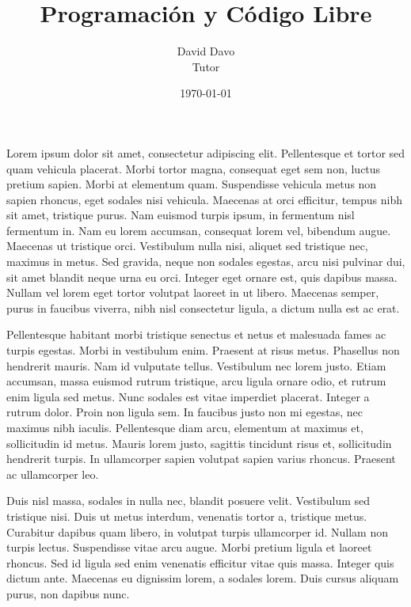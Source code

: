 \documentclass{article}
\title{Programación y Código Libre}
\author{David Davo\\Tutor}
\date{\today{}}
\begin{document}
{\Large\maketitle}
\newpage{}
\tableofcontents
\newpage{}


Lorem ipsum dolor sit amet, consectetur adipiscing elit. Pellentesque et tortor sed quam vehicula placerat. Morbi tortor magna, consequat eget sem non, luctus pretium sapien. Morbi at elementum quam. Suspendisse vehicula metus non sapien rhoncus, eget sodales nisi vehicula. Maecenas at orci efficitur, tempus nibh sit amet, tristique purus. Nam euismod turpis ipsum, in fermentum nisl fermentum in. Nam eu lorem accumsan, consequat lorem vel, bibendum augue. Maecenas ut tristique orci. Vestibulum nulla nisi, aliquet sed tristique nec, maximus in metus. Sed gravida, neque non sodales egestas, arcu nisi pulvinar dui, sit amet blandit neque urna eu orci. Integer eget ornare est, quis dapibus massa. Nullam vel lorem eget tortor volutpat laoreet in ut libero. Maecenas semper, purus in faucibus viverra, nibh nisl consectetur ligula, a dictum nulla est ac erat.

Pellentesque habitant morbi tristique senectus et netus et malesuada fames ac turpis egestas. Morbi in vestibulum enim. Praesent at risus metus. Phasellus non hendrerit mauris. Nam id vulputate tellus. Vestibulum nec lorem justo. Etiam accumsan, massa euismod rutrum tristique, arcu ligula ornare odio, et rutrum enim ligula sed metus. Nunc sodales est vitae imperdiet placerat. Integer a rutrum dolor. Proin non ligula sem. In faucibus justo non mi egestas, nec maximus nibh iaculis. Pellentesque diam arcu, elementum at maximus et, sollicitudin id metus. Mauris lorem justo, sagittis tincidunt risus et, sollicitudin hendrerit turpis. In ullamcorper sapien volutpat sapien varius rhoncus. Praesent ac ullamcorper leo.

Duis nisl massa, sodales in nulla nec, blandit posuere velit. Vestibulum sed tristique nisi. Duis ut metus interdum, venenatis tortor a, tristique metus. Curabitur dapibus quam libero, in volutpat turpis ullamcorper id. Nullam non turpis lectus. Suspendisse vitae arcu augue. Morbi pretium ligula et laoreet rhoncus. Sed id ligula sed enim venenatis efficitur vitae quis massa. Integer quis dictum ante. Maecenas eu dignissim lorem, a sodales lorem. Duis cursus aliquam purus, non dapibus nunc.
\end{document}

